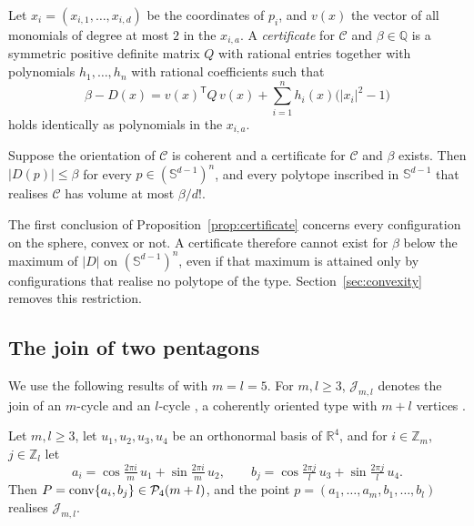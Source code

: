 \begin{definition}
  \label{def:certificate}
  Let $x_{i} = (x_{i,1}, \ldots, x_{i,d})$ be the coordinates of $p_{i}$, and
  $v(x)$ the vector of all monomials of degree at most $2$ in the $x_{i,a}$. A
  \emph{certificate} for $\mathcal{C}$ and $\beta \in \mathbb{Q}$ is a
  symmetric positive definite matrix $Q$ with rational entries together with
  polynomials $h_{1}, \ldots, h_{n}$ with rational coefficients such that
  \begin{equation}
    \label{eq:certificate}
    \beta - D(x) = v(x)^{\mathsf{T}} Q\, v(x)
      + \sum_{i=1}^{n} h_{i}(x)\bigl(|x_{i}|^{2} - 1\bigr)
  \end{equation}
  holds identically as polynomials in the $x_{i,a}$.
\end{definition}

\begin{proposition}
  \label{prop:certificate}
  Suppose the orientation of $\mathcal{C}$ is coherent and a certificate for
  $\mathcal{C}$ and $\beta$ exists. Then $|D(p)| \leq \beta$ for every
  $p \in (\mathbb{S}^{d-1})^{n}$, and every polytope inscribed in
  $\mathbb{S}^{d-1}$ that realises $\mathcal{C}$ has volume at most
  $\beta/d!$.
\end{proposition}

The first conclusion of Proposition~\ref{prop:certificate} concerns every
configuration on the sphere, convex or not. A certificate therefore cannot
exist for $\beta$ below the maximum of $|D|$ on
$(\mathbb{S}^{d-1})^{n}$, even if that maximum is attained only by
configurations that realise no polytope of the type.
Section~\ref{sec:convexity} removes this restriction.

\subsection{The join of two pentagons}

We use the following results of \cite{medgyes-maxvol-d4-n9} with
$m = l = 5$. For $m, l \geq 3$, $\mathcal{J}_{m,l}$ denotes the join of an
$m$-cycle and an $l$-cycle \cite[Definition~3.1]{medgyes-maxvol-d4-n9}, a
coherently oriented type with $m + l$ vertices
\cite[Lemma~3.3]{medgyes-maxvol-d4-n9}.

\begin{lemma}
  \label{lem:freesum}
  Let $m, l \geq 3$, let $u_{1}, u_{2}, u_{3}, u_{4}$ be an orthonormal basis of
  $\mathbb{R}^{4}$, and for $i \in \mathbb{Z}_{m}$, $j \in \mathbb{Z}_{l}$ let
  \[
    a_{i} = \cos\tfrac{2\pi i}{m}\,u_{1} + \sin\tfrac{2\pi i}{m}\,u_{2}, \qquad
    b_{j} = \cos\tfrac{2\pi j}{l}\,u_{3} + \sin\tfrac{2\pi j}{l}\,u_{4}.
  \]
  Then $P = \operatorname{conv}\{a_{i}, b_{j}\} \in \mathcal{P}_{4}(m + l)$, and the point
  $p = (a_{1}, \ldots, a_{m}, b_{1}, \ldots, b_{l})$ realises
  $\mathcal{J}_{m,l}$.
\end{lemma}

